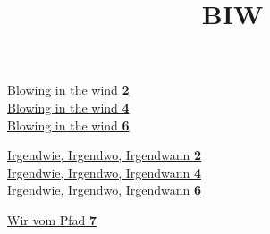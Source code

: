 \title{B} 
\hyperlink{page.2}{Blowing in the wind \textbf {2}} \\ 
\hyperlink{page.4}{Blowing in the wind \textbf {4}} \\ 
\hyperlink{page.6}{Blowing in the wind \textbf {6}} \\ 
\title{I} 
\hyperlink{page.2}{Irgendwie, Irgendwo, Irgendwann \textbf {2}} \\ 
\hyperlink{page.4}{Irgendwie, Irgendwo, Irgendwann \textbf {4}} \\ 
\hyperlink{page.6}{Irgendwie, Irgendwo, Irgendwann \textbf {6}} \\ 
\title{W} 
\hyperlink{page.7}{Wir vom Pfad \textbf {7}} \\ 
